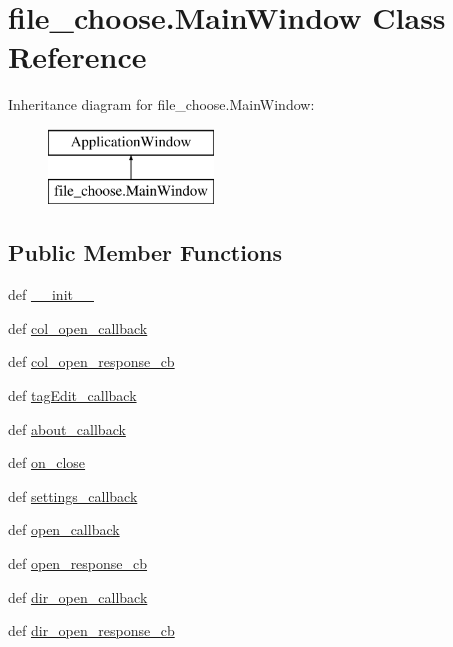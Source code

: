 \hypertarget{classfile__choose_1_1MainWindow}{\section{file\-\_\-choose.\-Main\-Window Class Reference}
\label{classfile__choose_1_1MainWindow}
}
Inheritance diagram for file\-\_\-choose.\-Main\-Window\-:\begin{figure}[H]
\begin{center}
\leavevmode
\includegraphics[height=2.000000cm]{classfile__choose_1_1MainWindow}
\end{center}
\end{figure}
\subsection*{Public Member Functions}
\begin{DoxyCompactItemize}
\item 
def \hyperlink{classfile__choose_1_1MainWindow_a0d10e7e4a44d9780107288dc2dd9220b}{\-\_\-\-\_\-init\-\_\-\-\_\-}
\item 
def \hyperlink{classfile__choose_1_1MainWindow_ad49cfa9f160158a7e3a83cd24b01a31e}{col\-\_\-open\-\_\-callback}
\item 
def \hyperlink{classfile__choose_1_1MainWindow_a011d718bd622d069252e78dc5f0938f7}{col\-\_\-open\-\_\-response\-\_\-cb}
\item 
def \hyperlink{classfile__choose_1_1MainWindow_aeecbe5035b03dd6a49948ea656c6659d}{tag\-Edit\-\_\-callback}
\item 
def \hyperlink{classfile__choose_1_1MainWindow_a0f30fd7eb17c3927de393ccabcabb7e0}{about\-\_\-callback}
\item 
def \hyperlink{classfile__choose_1_1MainWindow_a370aa9406738d9718cf447557d4e4890}{on\-\_\-close}
\item 
def \hyperlink{classfile__choose_1_1MainWindow_ab88fee4368005a828bd4dc8f5630a0ef}{settings\-\_\-callback}
\item 
def \hyperlink{classfile__choose_1_1MainWindow_aac9eb94882ec19e2163aee20e36a1e60}{open\-\_\-callback}
\item 
def \hyperlink{classfile__choose_1_1MainWindow_a31529647c093eee7092cd6a747d89115}{open\-\_\-response\-\_\-cb}
\item 
def \hyperlink{classfile__choose_1_1MainWindow_a5d333707ccd3ce7f0a53ddb40879a968}{dir\-\_\-open\-\_\-callback}
\item 
def \hyperlink{classfile__choose_1_1MainWindow_a1605c35552ab074ae261c58142b18887}{dir\-\_\-open\-\_\-response\-\_\-cb}
\end{DoxyCompactItemize}


